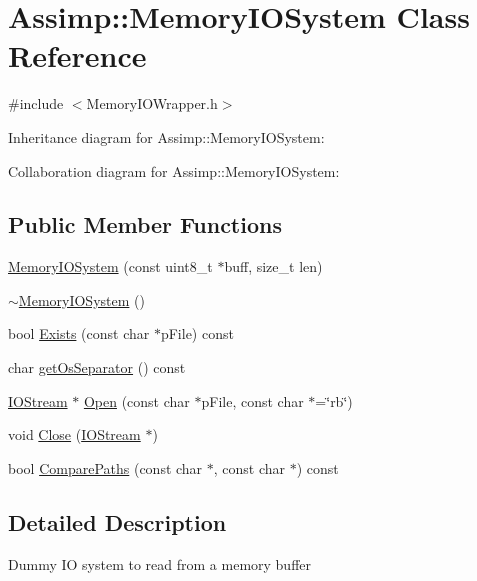 \hypertarget{class_assimp_1_1_memory_i_o_system}{\section{Assimp\+:\+:Memory\+I\+O\+System Class Reference}
\label{class_assimp_1_1_memory_i_o_system}
}


{\ttfamily \#include $<$Memory\+I\+O\+Wrapper.\+h$>$}



Inheritance diagram for Assimp\+:\+:Memory\+I\+O\+System\+:


Collaboration diagram for Assimp\+:\+:Memory\+I\+O\+System\+:
\subsection*{Public Member Functions}
\begin{DoxyCompactItemize}
\item 
\hyperlink{class_assimp_1_1_memory_i_o_system_abcf9de1e67f9fce1501c70233e799219}{Memory\+I\+O\+System} (const uint8\+\_\+t $\ast$buff, size\+\_\+t len)
\item 
\hyperlink{class_assimp_1_1_memory_i_o_system_addb4958e6a1492b5bea1695be4ca5744}{$\sim$\+Memory\+I\+O\+System} ()
\item 
bool \hyperlink{class_assimp_1_1_memory_i_o_system_a1d5c3081224a76443b2cf36550444c8c}{Exists} (const char $\ast$p\+File) const 
\item 
char \hyperlink{class_assimp_1_1_memory_i_o_system_a40192dd15ed0dd3262d0080deafb19f7}{get\+Os\+Separator} () const 
\item 
\hyperlink{class_assimp_1_1_i_o_stream}{I\+O\+Stream} $\ast$ \hyperlink{class_assimp_1_1_memory_i_o_system_a30b6aa8a64d0662a6b8b9fdd8368d94d}{Open} (const char $\ast$p\+File, const char $\ast$=\char`\"{}rb\char`\"{})
\item 
void \hyperlink{class_assimp_1_1_memory_i_o_system_a75c1ff1087a09e38efdd77a0a0339bfa}{Close} (\hyperlink{class_assimp_1_1_i_o_stream}{I\+O\+Stream} $\ast$)
\item 
bool \hyperlink{class_assimp_1_1_memory_i_o_system_a94e0e94f68a3077d117632a626344b99}{Compare\+Paths} (const char $\ast$, const char $\ast$) const 
\end{DoxyCompactItemize}


\subsection{Detailed Description}
Dummy I\+O system to read from a memory buffer 

